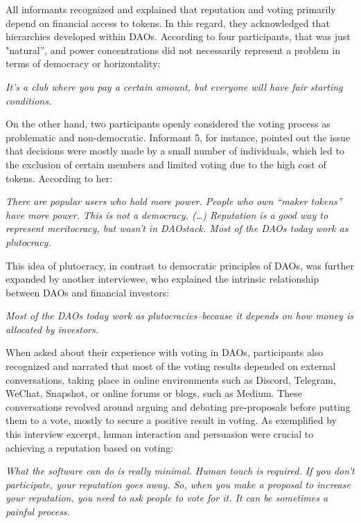 \documentclass[10pt,lineno]{wlpeerj}
\begin{document}
All informants recognized and explained that reputation and voting primarily depend on financial access to tokens. In this regard, they acknowledged that hierarchies developed within DAOs. According to four participants, that was just "natural”, and power concentrations did not necessarily represent a problem in terms of democracy or horizontality:

\begin{displayquote}[Informant 6]
\emph{It’s a club where you pay a certain amount, but everyone will have fair starting conditions.}
\end{displayquote}

On the other hand, two participants openly considered the voting process as problematic and non-democratic. Informant 5, for instance, pointed out the issue that decisions were mostly made by a small number of individuals, which led to the exclusion of certain members and limited voting due to the high cost of tokens. According to her:

\begin{displayquote}[Informant 5]
\emph{There are popular users who hold more power. People who own “maker tokens” have more power. This is not a democracy. (…) Reputation is a good way to represent meritocracy, but wasn’t in DAOstack. Most of the DAOs today work as plutocracy.}
\end{displayquote}

This idea of plutocracy, in contrast to democratic principles of DAOs, was further expanded by another interviewee, who explained the intrinsic relationship between DAOs and financial investors:

\begin{displayquote}[Informant 3]
\emph{Most of the DAOs today work as plutocracies--because it depends on how money is allocated by investors.}
\end{displayquote}

When asked about their experience with voting in DAOs, participants also recognized and narrated that most of the voting results depended on external conversations, taking place in online environments such as Discord, Telegram, WeChat, Snapshot, or online forums or blogs, such as Medium. These conversations revolved around arguing and debating pre-proposals before putting them to a vote, mostly to secure a positive result in voting. As exemplified by this interview excerpt, human interaction and persuasion were crucial to achieving a reputation based on voting:

\begin{displayquote}[Informant 2]
\emph{What the software can do is really minimal. Human touch is required. If you don’t participate, your reputation goes away. So, when you make a proposal to increase your reputation, you need to ask people to vote for it. It can be sometimes a painful process.}
\end{displayquote}
\end{document}
